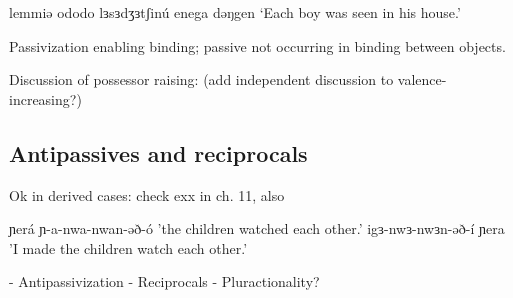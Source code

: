 lemmiə ododo lɜsɜdʒɜtʃinú enega dəŋgen		‘Each boy was seen in his house.’

Passivization enabling binding; passive not occurring in binding between objects.


Discussion of possessor raising: (add independent discussion to valence-increasing?)

% 



\subsection{Antipassives and reciprocals}\label{sec:ch12:antipassive}

Ok in derived cases: check exx in ch. 11, also

ɲerá ɲ-a-nwa-nwan-əð-ó	'the children watched each other.'
igɜ-nwɜ-nwɜn-əð-í ɲera	'I made the children watch each other.'


- Antipassivization
- Reciprocals
- Pluractionality?



